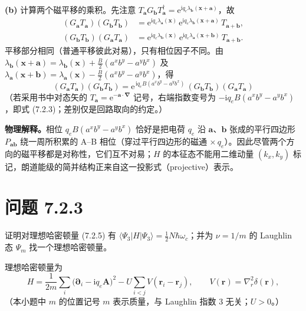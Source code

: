 \textbf{(b)} 计算两个磁平移的乘积。先注意 $T_{\pmb{a}}G_{\pmb{b}}T_{\pmb{a}}^{\dagger}=\mathrm{e}^{\mathrm{i}q_e\lambda_{\pmb{b}}(\pmb{x}+\pmb{a})}$，故
\begin{align*}
(G_{\pmb{a}}T_{\pmb{a}})(G_{\pmb{b}}T_{\pmb{b}})
&=\mathrm{e}^{\mathrm{i}q_e\lambda_{\pmb{a}}(\pmb{x})}\,
\mathrm{e}^{\mathrm{i}q_e\lambda_{\pmb{b}}(\pmb{x}+\pmb{a})}\,T_{\pmb{a}+\pmb{b}},\\
(G_{\pmb{b}}T_{\pmb{b}})(G_{\pmb{a}}T_{\pmb{a}})
&=\mathrm{e}^{\mathrm{i}q_e\lambda_{\pmb{b}}(\pmb{x})}\,
\mathrm{e}^{\mathrm{i}q_e\lambda_{\pmb{a}}(\pmb{x}+\pmb{b})}\,T_{\pmb{a}+\pmb{b}} .
\end{align*}
平移部分相同（普通平移彼此对易），只有相位因子不同。由 $\lambda_{\pmb{b}}(\pmb{x}+\pmb{a})=\lambda_{\pmb{b}}(\pmb{x})+\frac{B}{2}(a^xb^y-a^yb^x)$ 及 $\lambda_{\pmb{a}}(\pmb{x}+\pmb{b})=\lambda_{\pmb{a}}(\pmb{x})-\frac{B}{2}(a^xb^y-a^yb^x)$，得
\begin{equation*}
\boxed{\;(G_{\pmb{a}}T_{\pmb{a}})(G_{\pmb{b}}T_{\pmb{b}})
=\mathrm{e}^{\,\mathrm{i}q_eB(a^xb^y-a^yb^x)}
\,(G_{\pmb{b}}T_{\pmb{b}})(G_{\pmb{a}}T_{\pmb{a}})\;}
\end{equation*}
（若采用书中对态矢的 $T_{\pmb{a}}=\mathrm{e}^{-\pmb{a}\cdot\pmb{\nabla}}$ 记号，右端指数变号为 $-\mathrm{i}q_eB(a^xb^y-a^yb^x)$，即式 (7.2.3)；差别仅是回路取向的约定。）

\textbf{物理解释。}相位 $q_eB(a^xb^y-a^yb^x)$ 恰好是把电荷 $q_e$ 沿 $\pmb{a}$、$\pmb{b}$ 张成的平行四边形 $P_{\pmb{a}\pmb{b}}$ 绕一周所积累的 A--B 相位（穿过平行四边形的磁通 $\times\,q_e$）。因此尽管两个方向的磁平移都是对称性，它们互不对易；$H$ 的本征态不能用二维动量 $(k_x,k_y)$ 标记，朗道能级的简并结构正来自这一投影式（projective）表示。

\section*{问题 7.2.3}
\begin{problem}
证明对理想哈密顿量 (7.2.5) 有 $\langle\Psi_3|H|\Psi_3\rangle=\frac12N\hbar\omega_c$；并为 $\nu=1/m$ 的 Laughlin 态 $\Psi_m$ 找一个理想哈密顿量。
\end{problem}
\solution
理想哈密顿量为
\begin{equation*}
H=\frac{1}{2m}\sum_i\big(\pmb{\partial}_i-\mathrm{i}q_e\pmb{A}\big)^2
-U\sum_{i<j}V(\pmb{r}_i-\pmb{r}_j),
\qquad V(\pmb{r})=\nabla_{\!r}^2\delta(\pmb{r}),
\end{equation*}
（本小题中 $m$ 的位置记号 $m$ 表示质量，与 Laughlin 指数 3 无关；$U>0$。）

